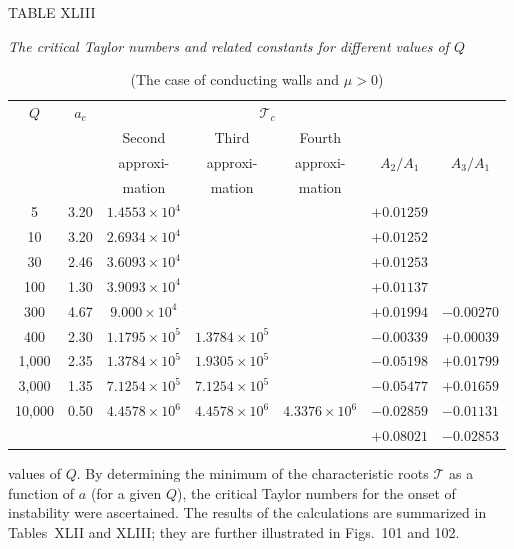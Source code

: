 \begin{table}[ht]
\centering
\caption*{TABLE XLIII}
\caption*{\textit{The critical Taylor numbers and related constants for different values of $Q$}}
\caption*{(The case of conducting walls and $\mu > 0$)}
\begin{tabular}{ccccccc}
\hline
$Q$ & $a_c$ & \multicolumn{4}{c}{$\mathscr{T}_c$} \\
\cline{3-6}
 & & Second & Third & Fourth & \\
 & & approxi- & approxi- & approxi- & $A_2/A_1$ & $A_3/A_1$ \\
 & & mation & mation & mation & & \\
\hline
5 & 3.20 & $1.4553 \times 10^4$ & & & $+0.01259$ & \\
10 & 3.20 & $2.6934 \times 10^4$ & & & $+0.01252$ & \\
30 & 2.46 & $3.6093 \times 10^4$ & & & $+0.01253$ & \\
100 & 1.30 & $3.9093 \times 10^4$ & & & $+0.01137$ & \\
300 & 4.67 & $9.000 \times 10^4$ & & & $+0.01994$ & $-0.00270$ \\
400 & 2.30 & $1.1795 \times 10^5$ & $1.3784 \times 10^5$ & & $-0.00339$ & $+0.00039$ \\
1,000 & 2.35 & $1.3784 \times 10^5$ & $1.9305 \times 10^5$ & & $-0.05198$ & $+0.01799$ \\
3,000 & 1.35 & $7.1254 \times 10^5$ & $7.1254 \times 10^5$ & & $-0.05477$ & $+0.01659$ \\
10,000 & 0.50 & $4.4578 \times 10^6$ & $4.4578 \times 10^6$ & $4.3376 \times 10^6$ & $-0.02859$ & $-0.01131$ \\
 & & & & & $+0.08021$ & $-0.02853$ \\
\hline
\end{tabular}
\end{table}

values of $Q$. By determining the minimum of the characteristic roots $\mathscr{T}$ as a function of $a$ (for a given $Q$), the critical Taylor numbers for the onset of instability were ascertained. The results of the calculations are summarized in Tables~XLII and XLIII; they are further illustrated in Figs.~101 and 102.



